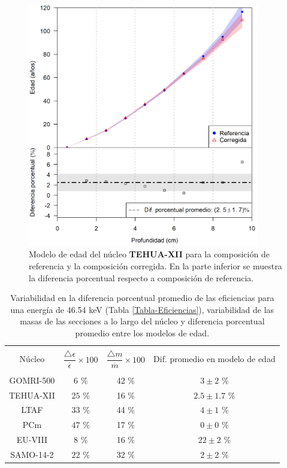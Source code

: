 \begin{figure}[h]
\centering
\includegraphics[width=0.9\textwidth]{Imagenes/TEHUA_1.png}
\caption{Modelo de edad del núcleo \textbf{TEHUA-XII} para la composición de referencia y la composición corregida. En la parte inferior se muestra la diferencia porcentual respecto a composición de referencia.}\label{ModeloEdad-TEHUAXII}
\end{figure}

\begin{table}[h]
\centering
\caption{Variabilidad en la diferencia porcentual promedio de las eficiencias para una energía de 46.54 keV (Tabla \ref{Tabla-Eficiencias}), variabilidad de las masas de las secciones a lo largo del núcleo y diferencia porcentual promedio entre los modelos de edad.}\label{Tabla-DiferenciasPorcentualesFechado}
\begin{tabular}{|c|c|c|c|} \hline 
\rowcolor{Blue2} & & & \\
\rowcolor{Blue2} Núcleo 			& $\dfrac{\bigtriangleup \epsilon}{\overline{\epsilon}} \times 100$ 	& $\dfrac{\bigtriangleup m}{\overline{m}} \times 100$ & Dif. promedio en modelo de edad \\
\rowcolor{Blue2} & & & \\ \hline
\rowcolor{Blue1} GOMRI-500 	& $6$ \% 								& 42 \% 			& $3\pm 2$ \% \\ 
\rowcolor{Blue1} TEHUA-XII 	&  $25$ \% 								& 16 \% 			&$2.5 \pm 1.7$ \% \\ 
\rowcolor{Blue1}LTAF 			& $33$ \% 								& 44 \% 			&$4\pm 1$ \%\\ 
\rowcolor{Blue1}PCm 				& $47$ \% 							& 17 \% 			&$0\pm 0$ \% \\
\rowcolor{Blue1} EU-VIII 			&	$8$ \% 								& 16 \% 			&$22\pm 2$ \% \\
\rowcolor{Blue1} SAMO-14-2 	&	$22$ \% 						& 32 \% 			&$2\pm 2$ \% \\
\hline
\end{tabular}
\end{table}